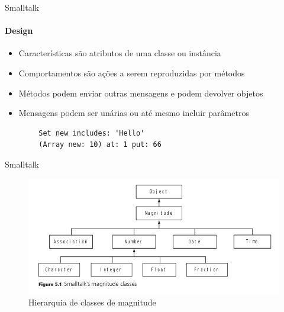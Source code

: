\begin{frame}[fragile]{Smalltalk}
\framesubtitle{Design}
    \begin{itemize}
        \item Características são atributos de uma classe ou instância
        \item Comportamentos são ações a serem reproduzidas por métodos
        \item Métodos podem enviar outras mensagens e podem devolver objetos
        \item Mensagens podem ser unárias ou até mesmo incluir parâmetros
    \end{itemize}
\begin{verbatim}
        Set new includes: 'Hello'
        (Array new: 10) at: 1 put: 66
\end{verbatim}
\end{frame}

\begin{frame}{Smalltalk}
    \begin{figure}
	\centering
	\includegraphics[width=0.8\linewidth]{img/magnitude}
	\caption{Hierarquia de classes de magnitude \cite{louden2012}}
	\label{fig:herancadiamante}
\end{figure}
\end{frame}
